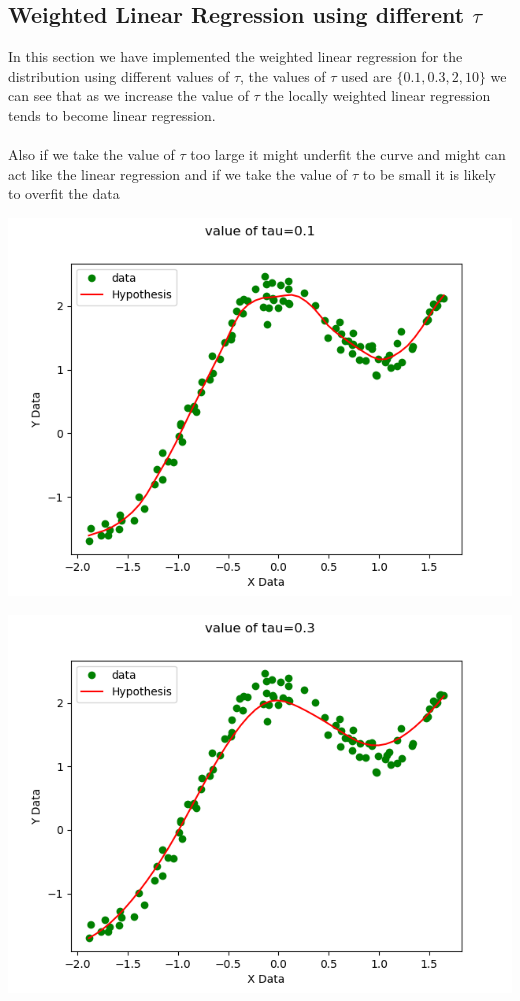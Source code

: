\documentclass[10pt]{article}
\begin{document}
\subsection{Weighted Linear Regression using different $\tau$}
In this section we have implemented the weighted linear regression for the distribution using different values of $\tau$, the values of $\tau$ used are $\{0.1, 0.3, 2,10\}$ we can see that as we increase the value of $\tau$ the locally weighted linear regression tends to become linear regression.
\\
\\
Also if we take the value of $\tau$ too large it might underfit the curve and might can act like the linear regression and if we take the value of $\tau$ to be small it is likely to overfit the data
\begin{center}
\includegraphics[scale=0.8]{weightedt01.png} 
\end{center} 
\begin{center}
\includegraphics[scale=0.8]{weightedt03.png} 
\end{center} 
\end{document}

